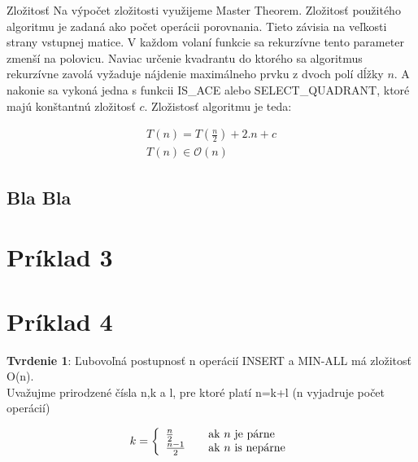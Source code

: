 \documentclass[paper=a4, fontsize=11pt]{scrartcl} %
\numberwithin{equation}{section} %
\numberwithin{figure}{section} %
\numberwithin{table}{section} %
\begin{document}
Zložitosť
Na výpočet zložitosti využijeme Master Theorem. Zložitosť použitého algoritmu je zadaná ako počet operácii porovnania. Tieto závisia na veľkosti strany vstupnej matice. V každom volaní funkcie  sa rekurzívne tento parameter zmenší na polovicu.
Naviac určenie kvadrantu do ktorého sa algoritmus rekurzívne zavolá vyžaduje nájdenie maximálneho prvku z dvoch polí dĺžky $n$. A nakonie sa vykoná jedna s funkcii IS\_ACE alebo SELECT\_QUADRANT, ktoré majú konštantnú zložitosť $c$. Zložistosť algoritmu je teda:

\begin{equation}
    \begin{aligned}
        T(n) = T\left(\frac{n}{2}\right) + 2.n + c \\
        T(n) \in \mathcal{O}(n)
    \end{aligned}
\end{equation}


\subsection{Bla Bla}



\pagebreak

\section*{Príklad 3}

\pagebreak

\section*{Príklad 4}

\textbf{Tvrdenie 1}: Ľubovoľná postupnosť n operácií INSERT  a MIN-ALL má zložitosť O(n). \\

Uvažujme prirodzené čísla n,k a l, pre ktoré platí n=k+l (n vyjadruje počet operácií)

\[ k = \left\{ 
  \begin{array}{l l}
    \frac{n}{2} & \quad \text{ak $n$ je párne}\\
    \frac{n-1}{2} & \quad \text{ak $n$ is nepárne}
  \end{array} \right.\]
\end{document}
